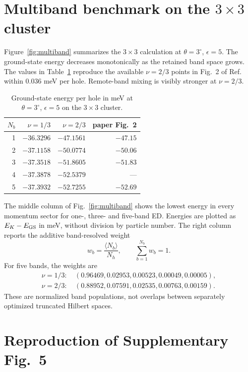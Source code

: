 \documentclass[10pt,twocolumn]{article}
\begin{document}
\section{Multiband benchmark on the $3\times3$ cluster}

Figure~\ref{fig:multiband} summarizes the $3\times3$ calculation at $\theta=3^\circ$, $\epsilon=5$.  The ground-state energy decreases monotonically as the retained band space grows.  The values in Table~\ref{tab:energies} reproduce the available $\nu=2/3$ points in Fig.~2 of Ref.~\cite{luo} within $0.036$ meV per hole.  Remote-band mixing is visibly stronger at $\nu=2/3$.

\begin{table}[H]
\centering
\caption{Ground-state energy per hole in meV at $\theta=3^\circ$, $\epsilon=5$ on the $3\times3$ cluster.}
\label{tab:energies}
\begin{tabular}{rrrr}
\toprule
$N_b$ & $\nu=1/3$ & $\nu=2/3$ & paper Fig.~2\\
\midrule
1 & $-36.3296$ & $-47.1561$ & $-47.15$\\
2 & $-37.1158$ & $-50.0774$ & $-50.06$\\
3 & $-37.3518$ & $-51.8605$ & $-51.83$\\
4 & $-37.3878$ & $-52.5379$ & ---\\
5 & $-37.3932$ & $-52.7255$ & $-52.69$\\
\bottomrule
\end{tabular}
\end{table}

The middle column of Fig.~\ref{fig:multiband} shows the lowest energy in every momentum sector for one-, three- and five-band ED.  Energies are plotted as $E_K-E_{\rm GS}$ in meV, without division by particle number.  The right column reports the additive band-resolved weight
\begin{equation}
w_b=\frac{\langle N_b\rangle}{N_h},\qquad \sum_{b=1}^{N_b}w_b=1.
\end{equation}
For five bands, the weights are
\begin{align}
\nu=1/3:&\ (0.96469,0.02953,0.00523,0.00049,0.00005),\\
\nu=2/3:&\ (0.88952,0.07591,0.02535,0.00763,0.00159).
\end{align}
These are normalized band populations, not overlaps between separately optimized truncated Hilbert spaces.

\section{Reproduction of Supplementary Fig.~5}
\end{document}
